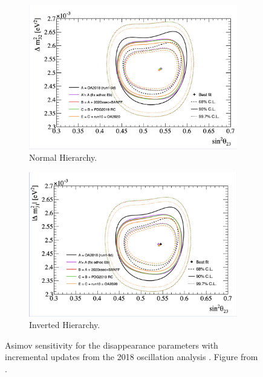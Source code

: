 \begin{figure}[!htbp]
\centering
\begin{subfigure}{.7\textwidth}
  \centering
  \includegraphics[width=0.95\linewidth, trim={0.5mm 0.5mm 0mm 0mm}, clip]{figs/jointPTheta_disNH}
  \caption{Normal Hierarchy.}
  \label{fig:20182020PTDisNH}
\end{subfigure}
\begin{subfigure}{.7\textwidth}
  \centering
  \includegraphics[width=0.95\linewidth, trim={1mm 0.5mm 0.5mm 0mm},clip]{figs/jointPTheta_disIH}
  \caption{Inverted Hierarchy.}
  \label{fig:20182020PTDisIH}
\end{subfigure}
\caption{Asimov sensitivity for the disappearance parameters with incremental updates from the 2018 oscillation analysis \cite{t2knature}. Figure from \cite{tn397}.}
\label{fig:20182020DisPT}
\end{figure}

